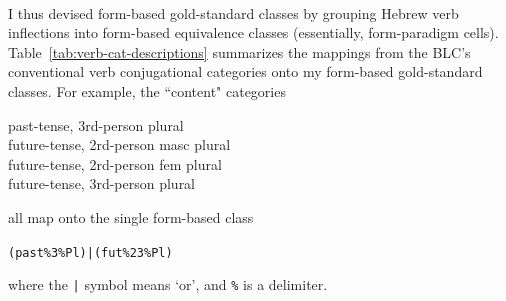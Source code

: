 { \begin{table}[bt]
 \centering
 \\
 \caption{Paradigms for the root \textit{g.m.r} in the \textit{Qal} binyan}
    \label{tab:qal-paradigms}
 \end{table}
I thus devised form-based gold-standard classes by grouping Hebrew verb inflections into form-based equivalence classes (essentially, form-paradigm cells). Table~\ref{tab:verb-cat-descriptions} summarizes the mappings from the BLC's conventional verb conjugational categories onto my form-based gold-standard classes. For example, the ``content" categories
\begin{center}
past-tense, 3rd-person plural \\
future-tense, 2rd-person masc plural \\
future-tense, 2rd-person fem plural \\
future-tense, 3rd-person plural \\
\end{center}
all map onto the single form-based class
\begin{center}
\texttt{(past\%3\%Pl)|(fut\%23\%Pl)}
\end{center}
where the \texttt{|} symbol means `or', and \texttt{\%} is a delimiter.

}
